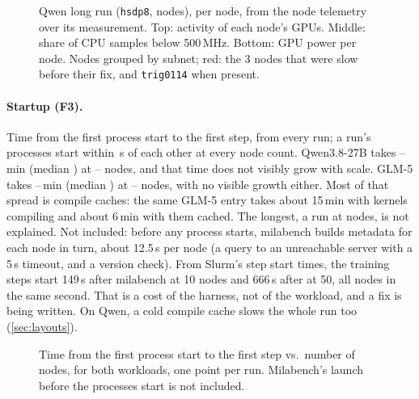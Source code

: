 \begin{figure}[h]
  \centering{}
  \caption{Qwen long run (\texttt{hsdp8}, \TriStragNodes{} nodes), per node, from the node telemetry over its measurement. Top: activity of each node's GPUs. Middle: share of CPU samples below 500\,MHz. Bottom: GPU power per node. Nodes grouped by subnet; red: the 3 nodes that were slow before their fix, and \texttt{trig0114} when present. }
  \label{fig:stragglers}
\end{figure}

\paragraph{Startup (F3).} Time from the first process start to the first step, from every run; a run's processes start within \TriStartSpreadMax\,s of each other at every node count. Qwen3.8-27B takes \TriStartQLo--\TriStartQHi\,min (median \TriStartQMed) at \TriStartQNodesLo--\TriStartQNodesHi{} nodes, and that time does not visibly grow with scale. GLM-5 takes \TriStartGLo--\TriStartGHi\,min (median \TriStartGMed) at \TriStartGNodesLo--\TriStartGNodesHi{} nodes, with no visible growth either. Most of that spread is compile caches: the same GLM-5 entry takes about 15\,min with kernels compiling and about 6\,min with them cached. The longest, a \texttt{\TriStartGTopLayout} run at \TriStartGTopNodes{} nodes, is not explained. Not included: before any process starts, milabench builds metadata for each node in turn, about 12.5\,s per node (a query to an unreachable server with a 5\,s timeout, and a version check). From Slurm's step start times, the training steps start 149\,s after milabench at 10 nodes and 666\,s after at 50, all nodes in the same second. That is a cost of the harness, not of the workload, and a fix is being written. On Qwen, a cold compile cache slows the whole run too (\cref{sec:layouts}).

\begin{figure}[h]
  \centering{}
  \caption{Time from the first process start to the first step vs.\ number of nodes, for both workloads, one point per run. Milabench's launch before the processes start is not included. }
  \label{fig:startup}
\end{figure}

